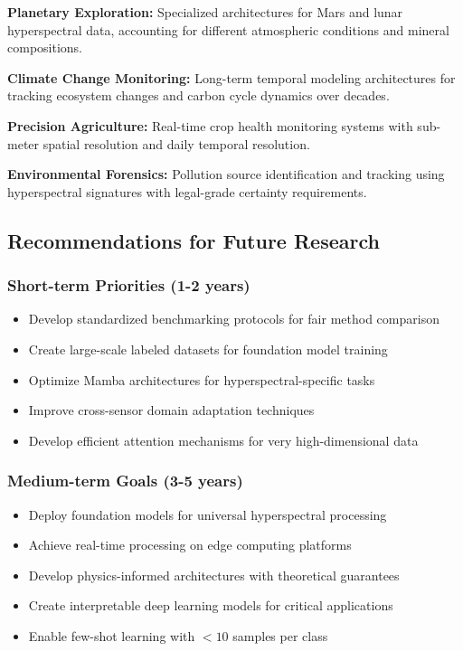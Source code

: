 \documentclass[journal]{IEEEtran}
\begin{document}
\textbf{Planetary Exploration:} Specialized architectures for Mars and lunar hyperspectral data, accounting for different atmospheric conditions and mineral compositions.

\textbf{Climate Change Monitoring:} Long-term temporal modeling architectures for tracking ecosystem changes and carbon cycle dynamics over decades.

\textbf{Precision Agriculture:} Real-time crop health monitoring systems with sub-meter spatial resolution and daily temporal resolution.

\textbf{Environmental Forensics:} Pollution source identification and tracking using hyperspectral signatures with legal-grade certainty requirements.

\subsection{Recommendations for Future Research}

\subsubsection{Short-term Priorities (1-2 years)}

\begin{itemize}
\item Develop standardized benchmarking protocols for fair method comparison
\item Create large-scale labeled datasets for foundation model training
\item Optimize Mamba architectures for hyperspectral-specific tasks
\item Improve cross-sensor domain adaptation techniques
\item Develop efficient attention mechanisms for very high-dimensional data
\end{itemize}

\subsubsection{Medium-term Goals (3-5 years)}

\begin{itemize}
\item Deploy foundation models for universal hyperspectral processing
\item Achieve real-time processing on edge computing platforms
\item Develop physics-informed architectures with theoretical guarantees
\item Create interpretable deep learning models for critical applications
\item Enable few-shot learning with $<10$ samples per class
\end{itemize}
\end{document}
